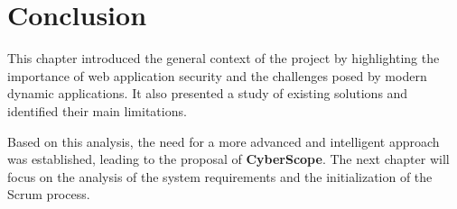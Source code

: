 \section{Conclusion}

\indent This chapter introduced the general context of the project by highlighting the importance of web application security and the challenges posed by modern dynamic applications. It also presented a study of existing solutions and identified their main limitations.

\indent Based on this analysis, the need for a more advanced and intelligent approach was established, leading to the proposal of \textbf{CyberScope}. The next chapter will focus on the analysis of the system requirements and the initialization of the Scrum process.
